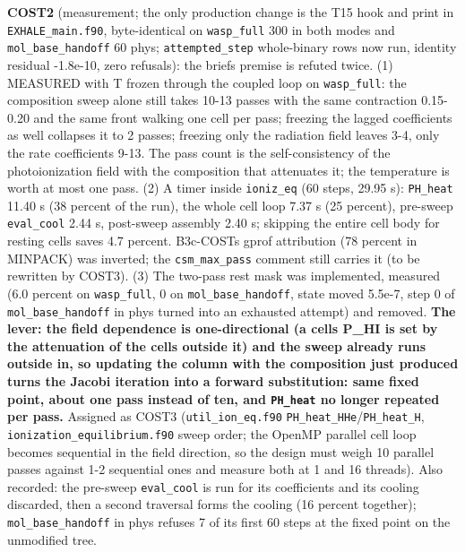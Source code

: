 \documentclass[english,a4paper]{my_memo}
\begin{document}
\begin{itemize}
  \textbf{COST2} (measurement; the only production change is the T15 hook and
  print in \texttt{EXHALE\_main.f90}, byte-identical on \texttt{wasp\_full} 300 in both
  modes and \texttt{mol\_base\_handoff} 60 phys; \texttt{attempted\_step} whole-binary rows
  now run, identity residual -1.8e-10, zero refusals): the brief\textquotesingle s premise
  is refuted twice. (1) MEASURED with T frozen through the coupled loop on
  \texttt{wasp\_full}: the composition sweep alone still takes 10-13 passes with the
  same contraction 0.15-0.20 and the same front walking one cell per pass;
  freezing the lagged coefficients as well collapses it to 2 passes;
  freezing only the radiation field leaves 3-4, only the rate coefficients
  9-13. The pass count is the self-consistency of the photoionization field
  with the composition that attenuates it; the temperature is worth at most
  one pass. (2) A timer inside \texttt{ioniz\_eq} (60 steps, 29.95 s): \texttt{PH\_heat}
  11.40 s (38 percent of the run), the whole cell loop 7.37 s (25 percent),
  pre-sweep \texttt{eval\_cool} 2.44 s, post-sweep assembly 2.40 s; skipping the
  entire cell body for resting cells saves 4.7 percent. B3c-COST\textquotesingle s gprof
  attribution (78 percent in MINPACK) was inverted; the \texttt{csm\_max\_pass}
  comment still carries it (to be rewritten by COST3). (3) The two-pass rest
  mask was implemented, measured (6.0 percent on \texttt{wasp\_full}, 0 on
  \texttt{mol\_base\_handoff}, state moved 5.5e-7, step 0 of \texttt{mol\_base\_handoff} in
  phys turned into an exhausted attempt) and removed. \textbf{The lever: the field
  dependence is one-directional (a cell\textquotesingle s P\_HI is set by the attenuation of
  the cells outside it) and the sweep already runs outside in, so updating
  the column with the composition just produced turns the Jacobi iteration
  into a forward substitution: same fixed point, about one pass instead of
  ten, and \texttt{PH\_heat} no longer repeated per pass.} Assigned as COST3
  (\texttt{util\_ion\_eq.f90} \texttt{PH\_heat\_HHe}/\texttt{PH\_heat\_H}, \texttt{ionization\_equilibrium.f90}
  sweep order; the OpenMP parallel cell loop becomes sequential in the field
  direction, so the design must weigh 10 parallel passes against 1-2
  sequential ones and measure both at 1 and 16 threads). Also recorded: the
  pre-sweep \texttt{eval\_cool} is run for its coefficients and its cooling
  discarded, then a second traversal forms the cooling (16 percent
  together); \texttt{mol\_base\_handoff} in phys refuses 7 of its first 60 steps at
  the fixed point on the unmodified tree.

\end{itemize}
\end{document}

